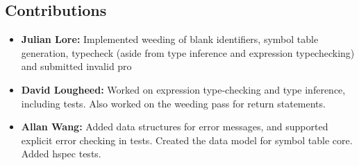 \documentclass[11pt]{article}
\begin{document}
\subsection{Contributions}
\label{sec:org9975fc6}
\begin{itemize}
\item \textbf{Julian Lore:} Implemented weeding of blank identifiers, symbol
table generation, typecheck (aside from type inference and
expression typechecking) and submitted invalid pro
\item \textbf{David Lougheed:} Worked on expression type-checking and type inference,
including tests. Also worked on the weeding pass for return
statements.
\item \textbf{Allan Wang:} Added data structures for error messages, and supported explicit error checking in tests. Created the data model for symbol table core. Added hspec tests.
\end{itemize}
\end{document}
